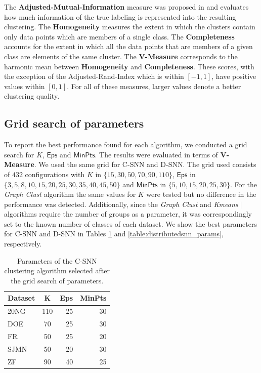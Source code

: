 \documentclass[smallextended]{svjour3}       %
\begin{document}
The \textbf{Adjusted-Mutual-Information} measure was proposed in \cite{VEB10} and evaluates how much information of the true labeling is represented into the resulting clustering. The \textbf{Homogeneity} measures the extent in which the clusters contain only data points which are members of a single class. The \textbf{Completeness} accounts for the extent in which all the data points that are members of a given class are elements of the same cluster. The \textbf{V-Measure} corresponds to the harmonic mean between \textbf{Homogeneity} and \textbf{Completeness}. These scores, with the exception of the Adjusted-Rand-Index which is within $[-1,1]$, have positive values within $[0,1]$. For all of these measures, larger values denote a better clustering quality.


\subsection*{Grid search of parameters}

To report the best performance found for each algorithm, we conducted a grid search for $K$, $\mathsf{Eps}$ and $\mathsf{MinPts}$. The results were evaluated in terms of \textbf{V-Measure}. We used the same grid for C-SNN and D-SNN.
The grid used consists of $432$ configurations with $K$ in $\{15, 30, 50, 70, 90, 110\}$, $\mathsf{Eps}$ in $\{3, 5, 8, 10, 15, 20, 25, 30, 35, 40, 45, 50\}$ and $\mathsf{MinPts}$ in $\{5, 10, 15, 20, 25, 30\}$. For the \textit{Graph Clust} algorithm the same values for $K$ were tested but no difference in the performance was detected. Additionally, since the \textit{Graph Clust} and \textit{Kmeans$||$} algorithms require the number of groups as a parameter, it was correspondingly set to the known number of classes of each dataset.
We show the best parameters for C-SNN and D-SNN in Tables \ref{table:centralizedsnn_params} and \ref{table:distributedsnn_params}, respectively.

\begin{table}[!htbp]
\centering
\begin{tabular}{l|crr}
\textbf{Dataset} & \textbf{K} & \textbf{Eps} & \textbf{MinPts} \\ \hline
20NG    & 110& 25 & 30 \\
DOE     &  70& 25 & 30 \\
FR      &  50& 25 & 20  \\
SJMN    &  50& 20 & 30 \\
ZF      &  90& 40 & 25 \\ \hline
\end{tabular}
\caption{Parameters of the C-SNN clustering algorithm selected after the grid search of parameters.}
\label{table:centralizedsnn_params}
\end{table}
\end{document}
